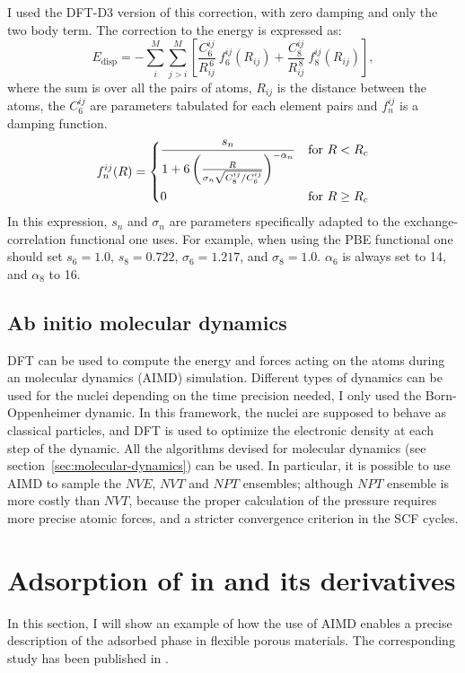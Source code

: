 \documentclass[thesis]{subfiles}
\begin{document}
I used the DFT-D3 version of this correction, with zero damping\cite{Grimme2010}
and only the two body term. The correction to the energy is expressed as:
\[E_\text{disp} = - \sum_i^M\sum_{j>i}^M\left[\frac{C_6^{ij}}{R_{ij}^{\,6}} \ f_6^{ij}(R_{ij}) + \frac{C_8^{ij}}{R_{ij}^{\,8}} \ f_8^{ij}(R_{ij})\right],\]
where the sum is over all the pairs of atoms, $R_{ij}$ is the distance between
the atoms, the $C_6^{ij}$ are parameters tabulated for each element pairs and
$f_n^{ij}$ is a damping function.
\[f_n^{ij}(R) =
\begin{dcases}
    \frac{s_n}{1 + 6 \left(\frac{R}{\sigma_n \sqrt{C_8^{ij} / C_6^{ij}}}\right)^{-\alpha_n}} &\text{for } R < R_c \\
    0 &\text{for } R \geq R_c \\
\end{dcases}\]
In this expression, $s_n$ and $\sigma_n$ are parameters specifically adapted to
the exchange-correlation functional one uses. For example, when using the PBE
functional one should set $s_6 = 1.0$, $s_8 = 0.722$, $\sigma_6 = 1.217$, and
$\sigma_8 = 1.0$. $\alpha_6$ is always set to 14, and $\alpha_8$ to 16.

\subsection{Ab initio molecular dynamics}

DFT can be used to compute the energy and forces acting on the atoms during an
\abinitio molecular dynamics (AIMD) simulation. Different types of dynamics can
be used for the nuclei depending on the time precision needed, I only used the
Born-Oppenheimer dynamic. In this framework, the nuclei are supposed to behave
as classical particles, and DFT is used to optimize the electronic density at
each step of the dynamic. All the algorithms devised for molecular dynamics (see
section~\ref{sec:molecular-dynamics}) can be used. In particular, it is possible
to use AIMD to sample the $NVE$, $NVT$ and $NPT$ ensembles; although $NPT$
ensemble is more costly than $NVT$, because the proper calculation of the
pressure requires more precise atomic forces, and a stricter convergence
criterion in the SCF cycles.

\newpage
\section{Adsorption of  in  and its derivatives}

In this section, I will show an example of how the use of AIMD enables a precise
description of the adsorbed phase in flexible porous materials. The
corresponding study has been published in
\cite{Chaplais2018}.
\end{document}
